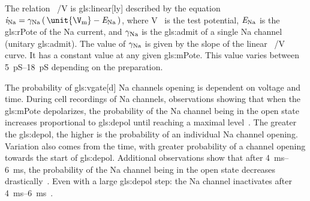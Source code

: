 \documentclass[class={myRUCProject}, crop=false]{standalone}
\begin{document}
The relation \unit[per-mode = symbol]{\ucur\sodium\per\V} is \gls{gls:linear}[ly] described by the equation \(\ucur\sodium = \ucon\sodium \br{\unit{\V\membrane}-\equi\sodium}\), where \unit{\V\membrane} is the test potential, \(\mathit{E}_\mathrm{Na}\) is the \gls{gls:rPote} of the \gls{Na} current, and \(\gamma_\mathrm{Na}\) is the \gls{gls:admit} of a single \gls{Na} channel (unitary \gls{gls:admit}). The value of \(\gamma_\mathrm{Na}\) is given by the slope of the linear \unit[per-mode = symbol]{\ucur\sodium\per\V} curve. It has a constant value at any given \gls{gls:mPote}. This value varies between \qtyrange{5}{18}{\pico\siemens} depending on the preparation.


The probability of \gls{gls:vgate}[d] \gls{Na} channels opening is dependent on voltage and time. 
During cell recordings of \gls{Na} channels, observations showing that when the \gls{gls:mPote} depolarizes, the probability of the \gls{Na} channel being in the open state increases proportional to \gls{gls:depol} until reaching a maximal level~\cite{Hammond2015ch4}. 
The greater the \gls{gls:depol}, the higher is the probability of an individual \gls{Na} channel opening. 
Variation also comes from the time, with greater probability of a channel opening towards the start of \gls{gls:depol}.
Additional observations show that after \qtyrange{4}{6}{\ms}, the probability of the \gls{Na} channel being in the open state decreases drastically~\cite{Hammond2015ch4}. 
Even with a large \gls{gls:depol} step: the \gls{Na} channel inactivates after \qtyrange{4}{6}{\ms}~\cite{Hammond2015ch4}. 
\end{document}
